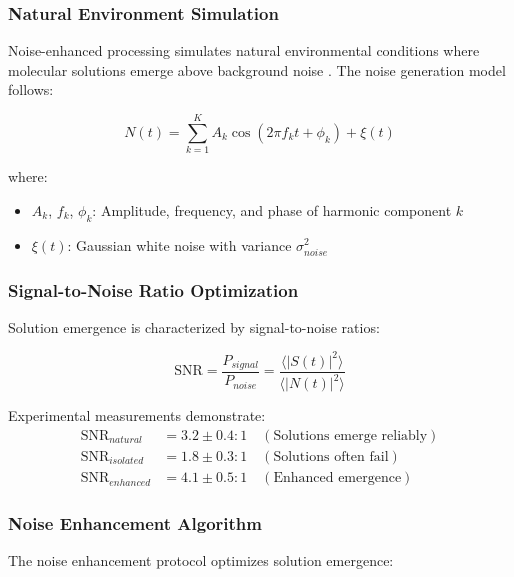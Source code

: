 \documentclass[12pt,a4paper]{article}
\begin{document}
\subsubsection{Natural Environment Simulation}

Noise-enhanced processing simulates natural environmental conditions where molecular solutions emerge above background noise \cite{mcdonnell2011benefits}. The noise generation model follows:

\begin{equation}
N(t) = \sum_{k=1}^{K} A_k \cos(2\pi f_k t + \phi_k) + \xi(t)
\end{equation}

where:
\begin{itemize}
\item $A_k$, $f_k$, $\phi_k$: Amplitude, frequency, and phase of harmonic component $k$
\item $\xi(t)$: Gaussian white noise with variance $\sigma^2_{noise}$
\end{itemize}

\subsubsection{Signal-to-Noise Ratio Optimization}

Solution emergence is characterized by signal-to-noise ratios:

\begin{equation}
\text{SNR} = \frac{P_{signal}}{P_{noise}} = \frac{\langle |S(t)|^2 \rangle}{\langle |N(t)|^2 \rangle}
\end{equation}

Experimental measurements demonstrate:
\begin{align}
\text{SNR}_{natural} &= 3.2 \pm 0.4 : 1 \quad (\text{Solutions emerge reliably}) \\
\text{SNR}_{isolated} &= 1.8 \pm 0.3 : 1 \quad (\text{Solutions often fail}) \\
\text{SNR}_{enhanced} &= 4.1 \pm 0.5 : 1 \quad (\text{Enhanced emergence})
\end{align}

\subsubsection{Noise Enhancement Algorithm}

The noise enhancement protocol optimizes solution emergence:
\end{document}
